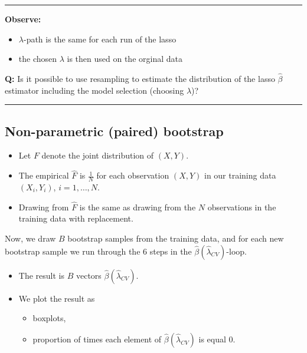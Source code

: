 \documentclass[
  letterpaper,
  DIV=11,
  numbers=noendperiod]{scrartcl}
\providecommand{\tightlist}{%
  \setlength{\itemsep}{0pt}\setlength{\parskip}{0pt}}\usepackage{longtable,booktabs,array}
\begin{document}
\begin{center}\rule{0.5\linewidth}{0.5pt}\end{center}

\textbf{Observe:}

\begin{itemize}
\tightlist
\item
  \(\lambda\)-path is the same for each run of the lasso
\item
  the chosen \(\lambda\) is then used on the orginal data
\end{itemize}

\textbf{Q:} Is it possible to use resampling to estimate the
distribution of the lasso \(\hat{\beta}\) estimator including the model
selection (choosing \(\lambda\))?

\begin{center}\rule{0.5\linewidth}{0.5pt}\end{center}

\hypertarget{non-parametric-paired-bootstrap}{%
\subsection{Non-parametric (paired)
bootstrap}\label{non-parametric-paired-bootstrap}}

\begin{itemize}
\tightlist
\item
  Let \(F\) denote the joint distribution of \((X,Y)\).
\item
  The empirical \(\hat{F}\) is \(\frac{1}{N}\) for each observation
  \((X,Y)\) in our training data \((X_i,Y_i)\), \(i=1,\ldots,N\).
\item
  Drawing from \(\hat{F}\) is the same as drawing from the \(N\)
  observations in the training data with replacement.
\end{itemize}

Now, we draw \(B\) bootstrap samples from the training data, and for
each new bootstrap sample we run through the 6 steps in the
\(\hat{\beta}(\hat{\lambda}_{CV})\)-loop.

\begin{itemize}
\tightlist
\item
  The result is \(B\) vectors \(\hat{\beta}(\hat{\lambda}_{CV})\).
\item
  We plot the result as

  \begin{itemize}
  \tightlist
  \item
    boxplots,
  \item
    proportion of times each element of
    \(\hat{\beta}(\hat{\lambda}_{CV})\) is equal 0.
  \end{itemize}
\end{itemize}
\end{document}
